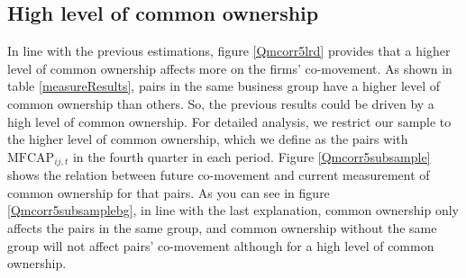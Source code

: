 		
		
		
		
		
		
		\subsection{{High level of common ownership}}
		
			In line with the previous estimations, figure \ref{Qmcorr5lrd} provides that a higher level of common ownership affects more on the firms' co-movement. As shown in table \ref{measureResults}, pairs in the same business group have a higher level of common ownership than others. So, the previous results could be driven by a high level of common ownership. For detailed analysis, we restrict our sample to the higher level of common ownership, which we define as the pairs with $\text{MFCAP}_{ij,t}$ in the fourth quarter in each period. Figure \ref{Qmcorr5subsample} shows the relation between future co-movement and current measurement of common ownership for that pairs. As you can see in figure \ref{Qmcorr5subsamplebg}, in line with the last explanation, common ownership only affects the pairs in the same group, and common ownership without the same group will not affect pairs' co-movement although for a high level of common ownership.
			
